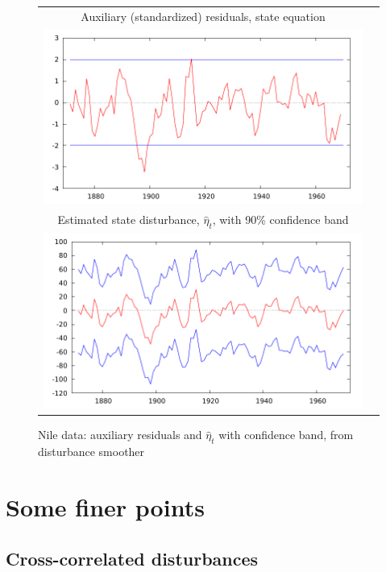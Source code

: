 \documentclass[a4paper]{article}
\begin{document}
\begin{figure}[htbp]
  \centering
  \begin{tabular}{cc}
  \small
  Auxiliary (standardized) residuals, state equation \\
    \includegraphics{figures/nile_eta_ksd} \\[10pt]
    \small Estimated state disturbance, $\hat{\eta}_t$, with 90\% confidence band \\
  \includegraphics{figures/nile_eta_dk}
  \end{tabular}
  \caption{Nile data: auxiliary residuals and $\hat{\eta}_t$ with
    confidence band, from disturbance smoother}
  \label{fig:nile}
\end{figure}

\section{Some finer points}
\label{sec:finer}

\subsection{Cross-correlated disturbances}
\label{sec:crossd}
\end{document}
